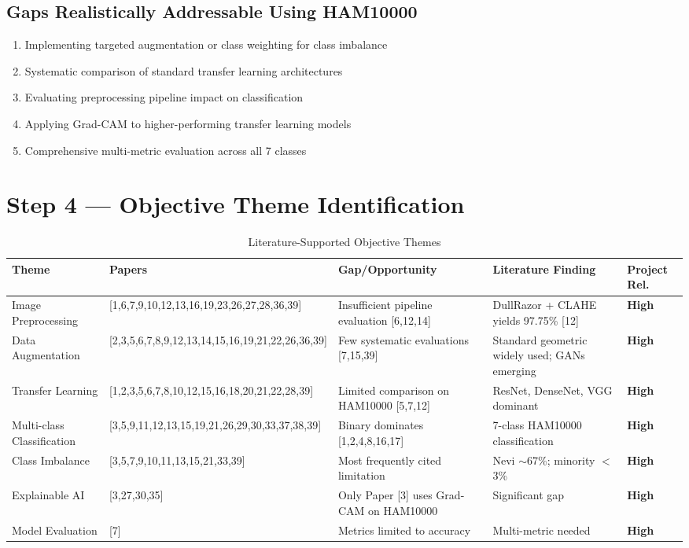 \documentclass[11pt,a4paper]{article}
\begin{document}
\subsection{Gaps Realistically Addressable Using HAM10000}
\begin{enumerate}[leftmargin=*,itemsep=2pt]
\item Implementing targeted augmentation or class weighting for class imbalance
\item Systematic comparison of standard transfer learning architectures
\item Evaluating preprocessing pipeline impact on classification
\item Applying Grad-CAM to higher-performing transfer learning models
\item Comprehensive multi-metric evaluation across all 7 classes
\end{enumerate}

\newpage

\section{Step 4 --- Objective Theme Identification}
\label{sec:step4}

\begin{longtable}{L{2.8cm} L{3.2cm} L{3.5cm} L{2.5cm} C{1.2cm}}
\caption{Literature-Supported Objective Themes}\label{tab:themes}\\
\toprule
\textbf{Theme} & \textbf{Papers} & \textbf{Gap/Opportunity} & \textbf{Literature Finding} & \textbf{Project Rel.} \\
\midrule
\endfirsthead
\midrule
\endhead
\bottomrule
\endlastfoot

Image Preprocessing & [1,6,7,9,10,12,13,16,19,23,26,27,28,36,39] & Insufficient pipeline evaluation [6,12,14] & DullRazor + CLAHE yields 97.75\% [12] & \textbf{High} \\
\midrule
Data Augmentation & [2,3,5,6,7,8,9,12,13,14,15,16,19,21,22,26,36,39] & Few systematic evaluations [7,15,39] & Standard geometric widely used; GANs emerging & \textbf{High} \\
\midrule
Transfer Learning & [1,2,3,5,6,7,8,10,12,15,16,18,20,21,22,28,39] & Limited comparison on HAM10000 [5,7,12] & ResNet, DenseNet, VGG dominant & \textbf{High} \\
\midrule
Multi-class Classification & [3,5,9,11,12,13,15,19,21,26,29,30,33,37,38,39] & Binary dominates [1,2,4,8,16,17] & 7-class HAM10000 classification & \textbf{High} \\
\midrule
Class Imbalance & [3,5,7,9,10,11,13,15,21,33,39] & Most frequently cited limitation & Nevi $\sim$67\%; minority $<$3\% & \textbf{High} \\
\midrule
Explainable AI & [3,27,30,35] & Only Paper [3] uses Grad-CAM on HAM10000 & Significant gap & \textbf{High} \\
\midrule
Model Evaluation & [7] & Metrics limited to accuracy & Multi-metric needed & \textbf{High} \\

\end{longtable}
\end{document}
